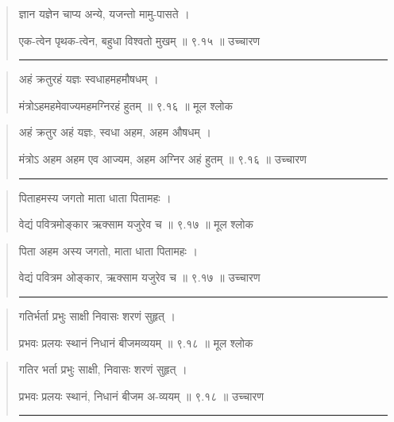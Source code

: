 \begin{quotation}

ज्ञान यज्ञेन चाप्य अन्ये, यजन्तो मामु-पासते ।  

एक-त्वेन पृथक-त्वेन, बहुधा विश्वतो मुखम्  ॥ ९.१५ ॥  उच्चारण

\noindent\rule{16cm}{0.4pt} 
\end{quotation}


\begin{quotation} 

अहं क्रतुरहं यज्ञः स्वधाहमहमौषधम्‌  ।  

मंत्रोऽहमहमेवाज्यमहमग्निरहं हुतम्‌  ॥ ९.१६ ॥  मूल श्लोक
\end{quotation}

\begin{quotation}

अहं क्रतुर अहं यज्ञः, स्वधा अहम, अहम औषधम्‌  ।  

मंत्रोऽ अहम अहम एव आज्यम, अहम अग्निर अहं हुतम्‌  ॥ ९.१६ ॥  उच्चारण

\noindent\rule{16cm}{0.4pt} 
\end{quotation}


\begin{quotation} 

पिताहमस्य जगतो माता धाता पितामहः  ।  

वेद्यं पवित्रमोङ्कार ऋक्साम यजुरेव च  ॥ ९.१७ ॥   मूल श्लोक
\end{quotation}

\begin{quotation}

पिता अहम अस्य जगतो, माता धाता पितामहः  ।  

वेद्यं पवित्रम ओङ्कार, ऋक्साम यजुरेव च  ॥ ९.१७ ॥  उच्चारण

\noindent\rule{16cm}{0.4pt} 
\end{quotation}


\begin{quotation} 
गतिर्भर्ता प्रभुः साक्षी निवासः शरणं सुहृत्‌  ।  

प्रभवः प्रलयः स्थानं निधानं बीजमव्ययम्‌  ॥ ९.१८ ॥  मूल श्लोक
\end{quotation}

\begin{quotation}

गतिर भर्ता प्रभुः साक्षी, निवासः शरणं सुहृत्‌  ।  

प्रभवः प्रलयः स्थानं, निधानं बीजम अ-व्ययम्‌  ॥ ९.१८ ॥  उच्चारण

\noindent\rule{16cm}{0.4pt} 
\end{quotation}


